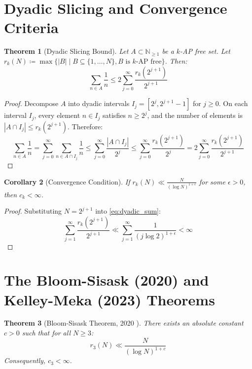 \documentclass[11pt,a4paper]{article}
\newtheorem{theorem}{Theorem}[section]
\newtheorem{corollary}[theorem]{Corollary}
\theoremstyle{definition}
\begin{document}
\section{Dyadic Slicing and Convergence Criteria}

\begin{theorem}[Dyadic Slicing Bound]\label{thm:dyadic_slicing}
Let $A \subset \mathbb{N}_{\ge 1}$ be a $k$-AP free set. Let $r_k(N) \coloneqq \max \{ |B| \mid B \subseteq \{1, \dots, N\}, B \text{ is } k\text{-AP free} \}$.
Then:
\begin{equation}\label{eq:dyadic_sum}
\sum_{n \in A} \frac{1}{n} \le 2 \sum_{j=0}^\infty \frac{r_k(2^{j+1})}{2^{j+1}}
\end{equation}
\end{theorem}

\begin{proof}
Decompose $A$ into dyadic intervals $I_j = [2^j, 2^{j+1} - 1]$ for $j \ge 0$.
On each interval $I_j$, every element $n \in I_j$ satisfies $n \ge 2^j$, and the number of elements is $|A \cap I_j| \le r_k(2^{j+1})$.
Therefore:
\[ \sum_{n \in A} \frac{1}{n} = \sum_{j=0}^\infty \sum_{n \in A \cap I_j} \frac{1}{n} \le \sum_{j=0}^\infty \frac{|A \cap I_j|}{2^j} \le \sum_{j=0}^\infty \frac{r_k(2^{j+1})}{2^j} = 2 \sum_{j=0}^\infty \frac{r_k(2^{j+1})}{2^{j+1}} \]
\end{proof}

\begin{corollary}[Convergence Condition]\label{cor:conv_cond}
If $r_k(N) \ll \frac{N}{(\log N)^{1 + \epsilon}}$ for some $\epsilon > 0$, then $c_k < \infty$.
\end{corollary}

\begin{proof}
Substituting $N = 2^{j+1}$ into \eqref{eq:dyadic_sum}:
\[ \sum_{j=1}^\infty \frac{r_k(2^{j+1})}{2^{j+1}} \ll \sum_{j=1}^\infty \frac{1}{(j \log 2)^{1 + \epsilon}} < \infty \]
\end{proof}

\section{The Bloom-Sisask (2020) and Kelley-Meka (2023) Theorems}

\begin{theorem}[Bloom-Sisask Theorem, 2020 \cite{bloom2020}]\label{thm:bloom_sisask}
There exists an absolute constant $c > 0$ such that for all $N \ge 3$:
\begin{equation}\label{eq:bs_bound}
r_3(N) \ll \frac{N}{(\log N)^{1 + c}}
\end{equation}
Consequently, $c_3 < \infty$.
\end{theorem}
\end{document}
